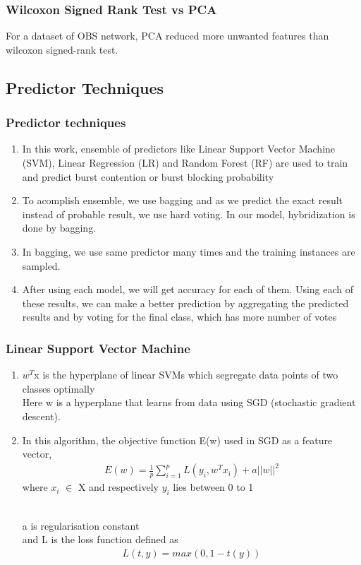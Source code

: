 \documentclass{beamer}
\begin{document}
\begin{frame}[fragile]
\frametitle{Wilcoxon Signed Rank Test vs PCA}
   \begin{block}{}
       For a dataset of OBS network, PCA reduced more unwanted features than wilcoxon signed-rank test.
    \end{block}
\end{frame}

\subsection*{Predictor Techniques}
\begin{frame}[fragile]
\frametitle{Predictor techniques}
\begin{enumerate}
    \item In this work, ensemble of predictors like
Linear Support Vector Machine (SVM), Linear Regression (LR)
and Random Forest (RF) are used to train and predict burst
contention or burst blocking probability
\item  To acomplish
ensemble, we use bagging and as we predict the exact result instead of probable result, we use hard voting. In our model,
hybridization is done by bagging.
\item In bagging, we use same predictor many times and the
training instances are sampled.
\item After using each model, we will get accuracy for each
of them. Using each of these results, we can make a better
prediction by aggregating the predicted results and by voting
for the final class, which has more number of votes

\end{enumerate}
\end{frame}

\begin{frame}[fragile]
\frametitle{Linear Support Vector Machine}
\begin{block}{}
   \begin{enumerate}
    \item  \(w^{T}\)x is the hyperplane of linear SVMs which segregate
    data points of two classes optimally
\\Here w is a hyperplane that learns from data using SGD (stochastic gradient descent).
\item In this algorithm, the
objective function E(w) used in SGD as a feature vector,
\begin{align}
    E(w) = \frac{1}{p}  \sum_{i=1}^{p} L(y_{i},w^{T}x_{i}) + a||w||^2
\end{align}
where \( x_{i}\) \(\in\) X and respectively \(y_{i}\) lies between 0 to 1

\\a is regularisation constant \\
and L is the loss function defined as 
\begin{align}
    L(t,y) = max(0, 1-t(y))
\end{align}
\end{enumerate}
\end{block}
\end{frame}
\end{document}
